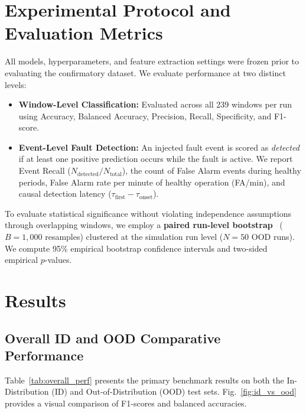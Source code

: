 \documentclass[conference]{IEEEtran}
\begin{document}
\section{Experimental Protocol and Evaluation Metrics}
All models, hyperparameters, and feature extraction settings were frozen prior to evaluating the confirmatory dataset. We evaluate performance at two distinct levels:
\begin{itemize}
    \item \textbf{Window-Level Classification:} Evaluated across all 239 windows per run using Accuracy, Balanced Accuracy, Precision, Recall, Specificity, and F1-score.
    \item \textbf{Event-Level Fault Detection:} An injected fault event is scored as \textit{detected} if at least one positive prediction occurs while the fault is active. We report Event Recall ($N_{\text{detected}} / N_{\text{total}}$), the count of False Alarm events during healthy periods, False Alarm rate per minute of healthy operation (FA/min), and causal detection latency ($\tau_{\text{first}} - \tau_{\text{onset}}$).
\end{itemize}

To evaluate statistical significance without violating independence assumptions through overlapping windows, we employ a \textbf{paired run-level bootstrap}~\cite{efron1993introduction} ($B = 1,000$ resamples) clustered at the simulation run level ($N=50$ OOD runs). We compute 95\% empirical bootstrap confidence intervals and two-sided empirical $p$-values.

\section{Results}

\subsection{Overall ID and OOD Comparative Performance}
Table~\ref{tab:overall_perf} presents the primary benchmark results on both the In-Distribution (ID) and Out-of-Distribution (OOD) test sets. Fig.~\ref{fig:id_vs_ood} provides a visual comparison of F1-scores and balanced accuracies.
\end{document}
